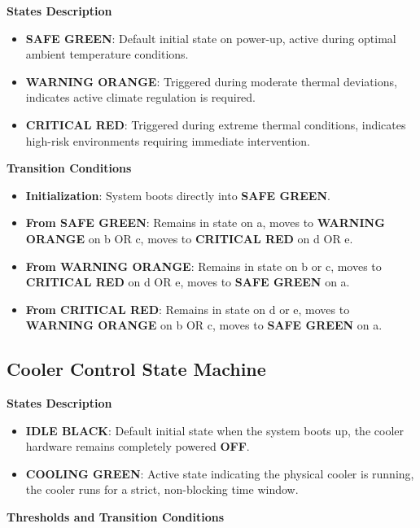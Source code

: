\textbf{States Description}

\begin{itemize}
  \item \textbf{SAFE GREEN}: Default initial state on power-up, active during optimal ambient temperature conditions.
  \item \textbf{WARNING ORANGE}: Triggered during moderate thermal deviations, indicates active climate regulation is required.
  \item \textbf{CRITICAL RED}: Triggered during extreme thermal conditions, indicates high-risk environments requiring
        immediate intervention.
\end{itemize}

\textbf{Transition Conditions}

\begin{itemize}
  \item \textbf{Initialization}: System boots directly into \textbf{SAFE GREEN}.
  \item \textbf{From SAFE GREEN}: Remains in state on a, moves to \textbf{WARNING ORANGE} on b OR c, moves to
        \textbf{CRITICAL RED} on d OR e.
  \item \textbf{From WARNING ORANGE}: Remains in state on b or c, moves to \textbf{CRITICAL RED} on d OR e, moves to
        \textbf{SAFE GREEN} on a.
  \item \textbf{From CRITICAL RED}: Remains in state on d or e, moves to \textbf{WARNING ORANGE} on b OR c, moves to
        \textbf{SAFE GREEN} on a.
\end{itemize}

\subsection{Cooler Control State Machine}

\textbf{States Description}

\begin{itemize}
  \item \textbf{IDLE BLACK}: Default initial state when the system boots up, the cooler hardware remains completely
        powered \textbf{OFF}.
  \item \textbf{COOLING GREEN}: Active state indicating the physical cooler is running, the cooler runs for a strict,
        non-blocking time window.
\end{itemize}

\textbf{Thresholds and Transition Conditions}

